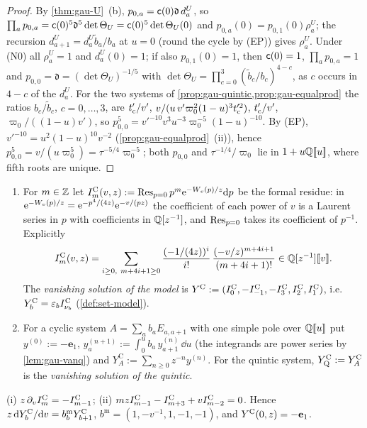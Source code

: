 \begin{proof}
By \cref{thm:gau-U}~(b), $p_{0,a}=\mathsf{c}(0)\mathfrak d\,d^U_a$, so $\prod_ap_{0,a}=\mathsf{c}(0)^5\mathfrak d^5\det\Theta_U=\mathsf{c}(0)^5\det\Theta_U(0)$ and $p_{0,a}(0)=p_{0,1}(0)\rho^U_a$; the recursion $d^U_{a+1}=d^U_a\tilde b_a/b_a$ at $u=0$ (round the cycle by (EP)) gives $\rho^U_a$. Under (N0) all $\rho^U_a=1$ and $d^U_a(0)=1$; if also $p_{0,1}(0)=1$, then $\mathsf{c}(0)=1$, $\prod_ap_{0,a}=1$ and $p_{0,0}=\mathfrak d=(\det\Theta_U)^{-1/5}$ with $\det\Theta_U=\prod_{c=0}^3(\tilde b_c/b_c)^{4-c}$, as $c$ occurs in $4-c$ of the $d^U_a$. For the two systems of \cref{prop:gau-quintic,prop:gau-equalprod} the ratios $b_c/\tilde b_c$, $c=0,\dots,3$, are $t_{\mathrm{c}}'/v'$, $v/(u\,v'\varpi_0^2(1-u)^3t_{\mathrm{c}}'^2)$, $t_{\mathrm{c}}'/v'$, $\varpi_0/((1-u)v')$, so $p_{0,0}^5=v'^{-10}v^3u^{-3}\varpi_0^{-5}(1-u)^{-10}$. By (EP), $v'^{-10}=u^2(1-u)^{10}v^{-2}$ (\cref{prop:gau-equalprod}~(ii)), hence $p_{0,0}^5=v/(u\varpi_0^5)=\tau^{-5/4}\varpi_0^{-5}$; both $p_{0,0}$ and $\tau^{-1/4}/\varpi_0$ lie in $1+u\mathbb{Q}[\![ u ]\!]$, where fifth roots are unique.
\end{proof}

\begin{defn}
\label{def:gau-van}
\begin{enumerate}
\item For $m\in\mathbb{Z}$ let $I^{\mathrm{C}}_m(v,z):=\operatorname*{Res}_{p=0}p^m\mathrm{e}^{-W_{v}(p)/z}\mathrm{d} p$ be the formal residue: in $\mathrm{e}^{-W_{v}(p)/z}=\mathrm{e}^{-p^4/(4z)}\mathrm{e}^{-v/(pz)}$ the coefficient of each power of $v$ is a Laurent series in $p$ with coefficients in $\mathbb{Q}[z^{-1}]$, and $\operatorname*{Res}_{p=0}$ takes its coefficient of $p^{-1}$. Explicitly
\[
\IC_m(v,z)=\sum_{i\geq0,\ m+4i+1\geq0}\frac{(-1/(4z))^i}{i!}\,\frac{(-v/z)^{m+4i+1}}{(m+4i+1)!}\in\bbQ[z^{-1}]\fps v .
\]
The \emph{vanishing solution of the model} is $Y^{\mathrm{C}}:=(I^{\mathrm{C}}_0,-I^{\mathrm{C}}_{-1},-I^{\mathrm{C}}_3,I^{\mathrm{C}}_2,I^{\mathrm{C}}_1)$, i.e.\ $Y^{\mathrm{C}}_b=\varepsilon_bI^{\mathrm{C}}_{\nu_b}$ (\cref{def:set-model}).
\item For a cyclic system $A=\sum_ab_aE_{a,a+1}$ with one simple pole over $\mathbb{Q}[\![ u ]\!]$ put $y^{(0)}:=-\mathbf e_1$, $y^{(n+1)}_a:=\int_0^ub_a\,y^{(n)}_{a+1}\,\dd u$ (the integrands are power series by \cref{lem:gau-vanq}) and $Y^{\mathrm C}_A:=\sum_{n\geq0}z^{-n}y^{(n)}$. For the quintic system, $Y^{\mathrm{C}}_{\mathrm{Q}}:=Y^{\mathrm C}_A$ is the \emph{vanishing solution of the quintic}.
\end{enumerate}
\end{defn}

\begin{lem}
\label{lem:gau-vanmod}
(i) $z\,\partial_vI^{\mathrm{C}}_m=-I^{\mathrm{C}}_{m-1}$; (ii) $mzI^{\mathrm{C}}_{m-1}-I^{\mathrm{C}}_{m+3}+vI^{\mathrm{C}}_{m-2}=0$. Hence $z\,\mathrm{d}Y^{\mathrm{C}}_b/\mathrm{d} v=b^{\mathrm m}_bY^{\mathrm{C}}_{b+1}$, $b^{\mathrm m}=(1,-v^{-1},1,-1,-1)$, and $Y^{\mathrm{C}}(0,z)=-\mathbf e_1$.
\end{lem}

